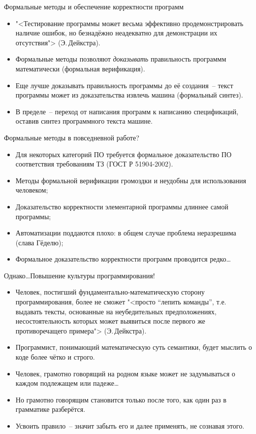 \documentclass[landscape]{slides}
\begin{document}
\begin{slide}
Формальные методы и обеспечение корректности программ
\begin{itemize}
\item "<Тестирование программы может весьма эффективно продемонстрировать наличие ошибок, но безнадёжно неадекватно для демонстрации их отсутствия"> (Э.\,Дейкстра).
\item Формальные методы позволяют \emph{доказывать} правильность программм математически (формальная верификация).
\item Еще лучше доказывать правильность программы до её создания~-- текст программы может из доказательства извлечь машина (формальный синтез).
\item В пределе~-- переход от написания программ к написанию спецификаций, оставив синтез программного текста машине.
\end{itemize}
\end{slide}

\begin{slide}
Формальные методы в повседневной работе?
\begin{itemize}
\item Для некоторых категорий ПО требуется формальное доказательство ПО соответствия требованиям ТЗ (ГОСТ Р 51904-2002).
\item Методы формальной верификации громоздки и неудобны для использования человеком;
\item Доказательство корректности элементарной программы длиннее самой программы;
\item Автоматизации поддаются плохо: в общем случае проблема неразрешима (слава Гёделю);
\item Формальное доказательство корректности программ проводится редко\ldots
\end{itemize}
\end{slide}

\begin{slide}
Однако\ldots Повышение культуры программирования!
\begin{itemize}
\item Человек, постигший фундаментально-математическую сторону программирования, более не сможет
"<просто ``лепить команды'', т.е. выдавать тексты, основанные на неубедительных предположениях, несостоятельность которых может выявиться после первого же противоречащего примера"> (Э.\,Дейкстра).
\item Программист, понимающий математическую суть семантики, будет мыслить о коде более чётко и строго.
\item Человек, грамотно говорящий на родном языке может не задумываться о каждом подлежащем или падеже\ldots
\item Но грамотно говорящим становится только после того, как один раз в грамматике разберётся.
\item Усвоить правило~-- значит забыть его и далее применять, не сознавая этого.
\end{itemize}
\end{slide}
\end{document}
